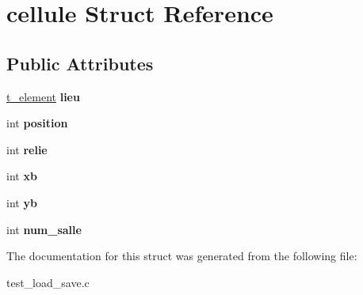 \hypertarget{structcellule}{}\section{cellule Struct Reference}
\label{structcellule}
\subsection*{Public Attributes}
\begin{DoxyCompactItemize}
\item 
\hyperlink{total_8h_a8b071baf43ce73c99f88fc8169b0514d}{t\+\_\+element} {\bfseries lieu}\hypertarget{structcellule_ab803a041ad92aa00522a4f4e768d4218}{}\label{structcellule_ab803a041ad92aa00522a4f4e768d4218}

\item 
int {\bfseries position}\hypertarget{structcellule_ab51d52172750a4b38b91cbc6fc7df0fb}{}\label{structcellule_ab51d52172750a4b38b91cbc6fc7df0fb}

\item 
int {\bfseries relie}\hypertarget{structcellule_a3197baeb74b3e03a3ccf4db33e1a4824}{}\label{structcellule_a3197baeb74b3e03a3ccf4db33e1a4824}

\item 
int {\bfseries xb}\hypertarget{structcellule_a8cbde201da76316b68bfb4028161f447}{}\label{structcellule_a8cbde201da76316b68bfb4028161f447}

\item 
int {\bfseries yb}\hypertarget{structcellule_a964cfd6eb1e6f95cde7fec362949de90}{}\label{structcellule_a964cfd6eb1e6f95cde7fec362949de90}

\item 
int {\bfseries num\+\_\+salle}\hypertarget{structcellule_a2fde4e84fc40fa2ec0c327629806c79d}{}\label{structcellule_a2fde4e84fc40fa2ec0c327629806c79d}

\end{DoxyCompactItemize}


The documentation for this struct was generated from the following file\+:\begin{DoxyCompactItemize}
\item 
test\+\_\+load\+\_\+save.\+c\end{DoxyCompactItemize}
